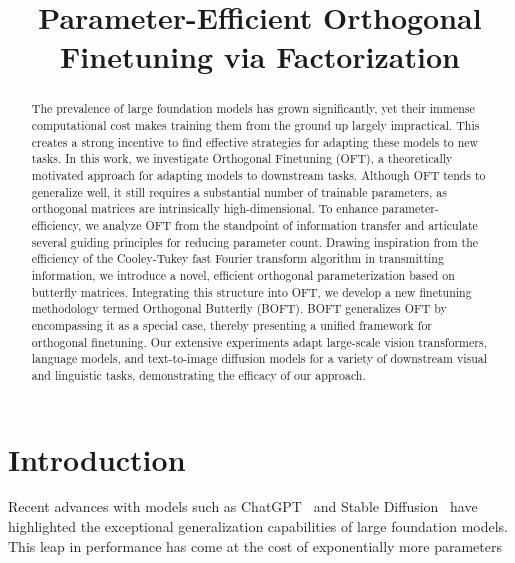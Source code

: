 \title{Parameter-Efficient Orthogonal Finetuning via Factorization}

\begin{abstract}
The prevalence of large foundation models has grown significantly, yet their immense computational cost makes training them from the ground up largely impractical. This creates a strong incentive to find effective strategies for adapting these models to new tasks. In this work, we investigate Orthogonal Finetuning (OFT), a theoretically motivated approach for adapting models to downstream tasks. Although OFT tends to generalize well, it still requires a substantial number of trainable parameters, as orthogonal matrices are intrinsically high-dimensional. To enhance parameter-efficiency, we analyze OFT from the standpoint of information transfer and articulate several guiding principles for reducing parameter count. Drawing inspiration from the efficiency of the Cooley-Tukey fast Fourier transform algorithm in transmitting information, we introduce a novel, efficient orthogonal parameterization based on butterfly matrices. Integrating this structure into OFT, we develop a new finetuning methodology termed Orthogonal Butterfly (BOFT). BOFT generalizes OFT by encompassing it as a special case, thereby presenting a unified framework for orthogonal finetuning. Our extensive experiments adapt large-scale vision transformers, language models, and text-to-image diffusion models for a variety of downstream visual and linguistic tasks, demonstrating the efficacy of our approach.
\end{abstract}

\section{Introduction}

Recent advances with models such as ChatGPT~\cite{brown2020language,chen2021evaluating} and Stable Diffusion~\cite{rombach2022high} have highlighted the exceptional generalization capabilities of large foundation models. This leap in performance has come at the cost of exponentially more parameters 

